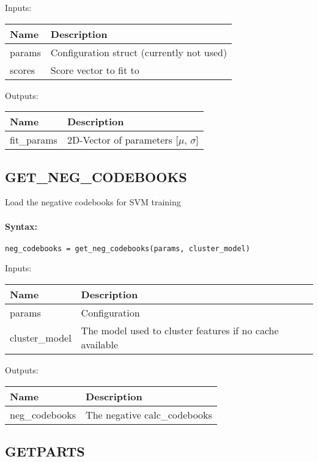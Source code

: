 \bigskip
Inputs:

\begin{tabular}{|p{}|p{}|}
\hline
\textbf{Name} & \textbf{Description} \\
\hline \hline
params & Configuration struct (currently not used)  \\ \hline
scores & Score vector to fit to  \\ \hline
\end{tabular}

\bigskip
Outputs:

\begin{tabular}{|p{}|p{}|}
\hline
\textbf{Name} & \textbf{Description} \\
\hline \hline
fit\_params & 2D-Vector of parameters [$\mu$, $\sigma$]  \\ \hline
\end{tabular}

\subsection{GET\_NEG\_CODEBOOKS}

Load the negative codebooks for SVM training

\paragraph{Syntax:} \verb|neg_codebooks = get_neg_codebooks(params, cluster_model)|

\bigskip
Inputs:

\begin{tabular}{|p{}|p{}|}
\hline
\textbf{Name} & \textbf{Description} \\
\hline \hline
params & Configuration  \\ \hline
cluster\_model & The model used to cluster features if no cache available  \\ \hline
\end{tabular}

\bigskip
Outputs:

\begin{tabular}{|p{}|p{}|}
\hline
\textbf{Name} & \textbf{Description} \\
\hline \hline
neg\_codebooks & The negative calc\_codebooks  \\ \hline
\end{tabular}

\subsection{GETPARTS}

